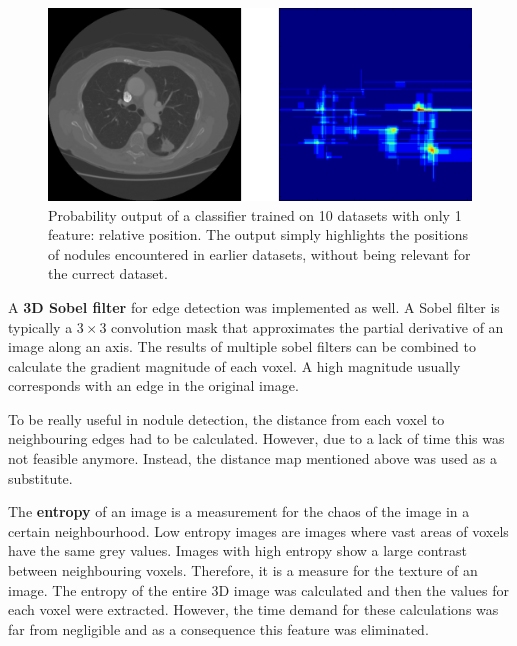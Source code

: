\begin{figure}[ht]
\begin{center}
  \includegraphics[width=\linewidth]{img/RelPositionFeature.png}
  \caption[]{Probability output of a classifier trained on 10 datasets with only
  1 feature: relative position. The output simply highlights the positions of
  nodules encountered in earlier datasets, without being relevant for the
  currect dataset.}
  \label{fig:posFeature}
\end{center}
\end{figure}

A \textbf{3D Sobel filter} for edge detection was implemented as well. A Sobel
filter is typically a $3 \times 3$ convolution mask that approximates the
partial derivative of an image along an axis. The results of multiple sobel
filters can be combined to calculate the gradient magnitude of each voxel. A
high magnitude usually corresponds with an edge in the original image.

To be really useful in nodule detection, the distance from each voxel to
neighbouring edges had to be calculated. However, due to a lack of time this was
not feasible anymore. Instead, the distance map mentioned above was used as a
substitute.

The \textbf{entropy} of an image is a measurement for the chaos of the image in a
certain neighbourhood. Low entropy images are images where vast areas of voxels
have the same grey values. Images with high entropy show a large contrast
between neighbouring voxels. Therefore, it is a measure for the texture of an
image. The entropy of the entire 3D image was calculated and then the values for
each voxel were extracted. However, the time demand for these calculations was
far from negligible and as a consequence this feature was eliminated.


